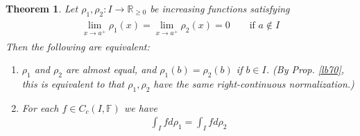 \documentclass[12pt,b5paper,notitlepage]{article}
\theoremstyle{definition}
\theoremstyle{plain}
\newtheorem{thm}[df]{Theorem}
\newcommand{\Rbb}{\mathbb R}
\newcommand{\Fbb}{\mathbb F}
\numberwithin{equation}{section}
\begin{document}
\begin{thm}\label{lb72}
Let $\rho_1,\rho_2:I\rightarrow\Rbb_{\geq0}$ be  increasing functions satisfying
\begin{gather}\label{eq48}
\begin{gathered}
\lim_{x\rightarrow a^+}\rho_1(x)=\lim_{x\rightarrow a^+}\rho_2(x)=0\qquad\text{if }a\notin I
\end{gathered}
\end{gather}
Then the following are equivalent:
\begin{enumerate}[label=(\arabic*)]
\item $\rho_1$ and $\rho_2$ are almost equal, and $\rho_1(b)=\rho_2(b)$ if $b\in I$. (By Prop. \ref{lb70}, this is equivalent to that $\rho_1,\rho_2$ have the same right-continuous normalization.)
\item For each $f\in C_c(I,\Fbb)$ we have
\begin{align*}
\int_I fd\rho_1=\int_I fd\rho_2
\end{align*}
\end{enumerate}
\end{thm}
\end{document}
